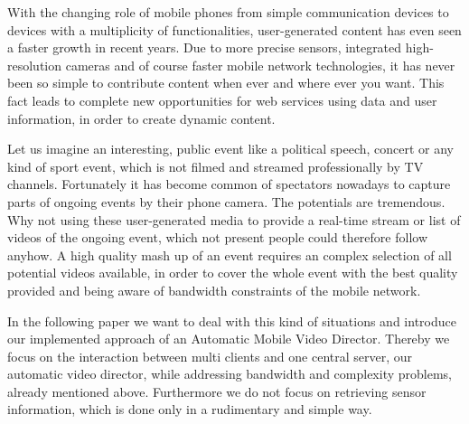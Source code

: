 \documentclass[conference]{IEEEtran}
\begin{document}
With the changing role of mobile phones from simple communication devices to devices with a multiplicity of functionalities, user-generated content has even seen a faster growth in recent years. Due to more precise sensors, integrated high-resolution cameras and of course faster mobile network technologies, it has never been so simple to contribute content when ever and where ever you want. 
This fact leads to complete new opportunities for web services using data and user information, in order to create dynamic content.

Let us imagine an interesting, public event like a political speech, concert or any kind of sport event, which is not filmed and streamed professionally by TV channels. Fortunately it has become common of spectators nowadays to capture parts of ongoing events by their phone camera. The potentials are tremendous. Why not using these user-generated media to provide a real-time stream or list of videos of the ongoing event, which not present people could therefore follow anyhow. A high quality mash up of an event requires an complex selection of all potential videos available, in order to cover the whole event with the best quality provided and being aware of bandwidth constraints of the mobile network. 

In the following paper we want to deal with this kind of situations and introduce our implemented approach of an Automatic Mobile Video Director. Thereby we focus on the interaction between multi clients and one central server, our automatic video director, while addressing bandwidth and complexity problems, already mentioned above. Furthermore we do not focus on retrieving sensor information, which is done only in a rudimentary and simple way.


%
%
\end{document}
